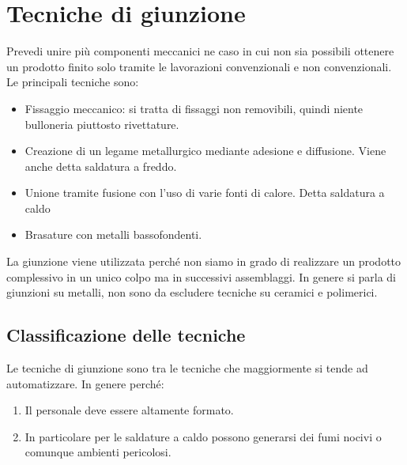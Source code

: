 \chapter{Tecniche di giunzione}\label{chp:Giunzione}
Prevedi unire più componenti meccanici ne caso in cui non sia possibili ottenere un prodotto finito solo tramite le lavorazioni convenzionali e non convenzionali.
Le principali tecniche sono:
\begin{itemize}
\item Fissaggio meccanico: si tratta di fissaggi non removibili, quindi niente bulloneria piuttosto rivettature.
\item Creazione di un legame metallurgico mediante adesione e diffusione.
Viene anche detta saldatura a freddo.
\item Unione tramite fusione con l'uso di varie fonti di calore. Detta saldatura a caldo
\item Brasature con metalli bassofondenti.
\end{itemize}

La giunzione viene utilizzata perché non siamo in grado di realizzare un prodotto complessivo in un unico colpo ma in successivi assemblaggi.
In genere si parla di giunzioni su metalli, non sono da escludere tecniche su ceramici e polimerici.

\section{Classificazione delle tecniche}


Le tecniche di giunzione sono tra le tecniche che maggiormente si tende ad automatizzare.
In genere perché:
\begin{enumerate}
\item Il personale deve essere altamente formato.
\item In particolare per le saldature a caldo possono generarsi dei fumi nocivi o comunque ambienti pericolosi.
\end{enumerate}


